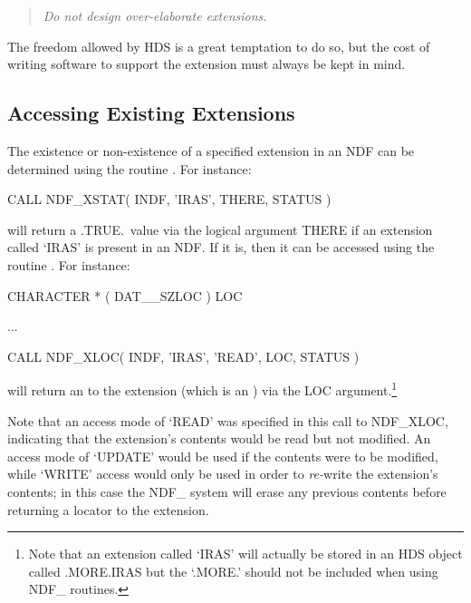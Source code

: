 \documentclass[twoside,11pt,nolof]{starlink}
\providecommand{\st}[1]{{\emph{#1}}}
\begin{document}
\begin{quote}
\begin{center}
\st{Do not design over-elaborate extensions.}
\end{center}
\end{quote}

The freedom allowed by HDS is a great temptation to do so, but the cost of
writing software to support the extension must always be kept in mind.

\subsection{\label{ss:accessingexistingextensions}Accessing Existing Extensions}

The existence or non-existence of a specified extension in an NDF can be
determined using the routine .
For instance:

\small
\begin{terminalv}
      CALL NDF_XSTAT( INDF, 'IRAS', THERE, STATUS )
\end{terminalv}
\normalsize

will return a .TRUE.\ value via the logical argument THERE if an extension
called `IRAS' is present in an NDF.
If it is, then it can be accessed using the routine .
For instance:

\small
\begin{terminalv}
      CHARACTER * ( DAT__SZLOC ) LOC

      ...

      CALL NDF_XLOC( INDF, 'IRAS', 'READ', LOC, STATUS )
\end{terminalv}
\normalsize

will return an  to the
extension (which is an ) via the
LOC argument.\footnote{Note that an extension called `IRAS' will
actually be stored in an HDS object called .MORE.IRAS but the `.MORE.'
should not be included when using NDF\_ routines.}

Note that an access mode of `READ' was specified in this call to NDF\_XLOC,
indicating that the extension's contents would be read but not modified.
An access mode of `UPDATE' would be used if the contents were to be
modified, while `WRITE' access would only be used in order to \st{re-\/}write
the extension's contents; in this case the NDF\_ system will erase any
previous contents before returning a locator to the extension.
\end{document}

